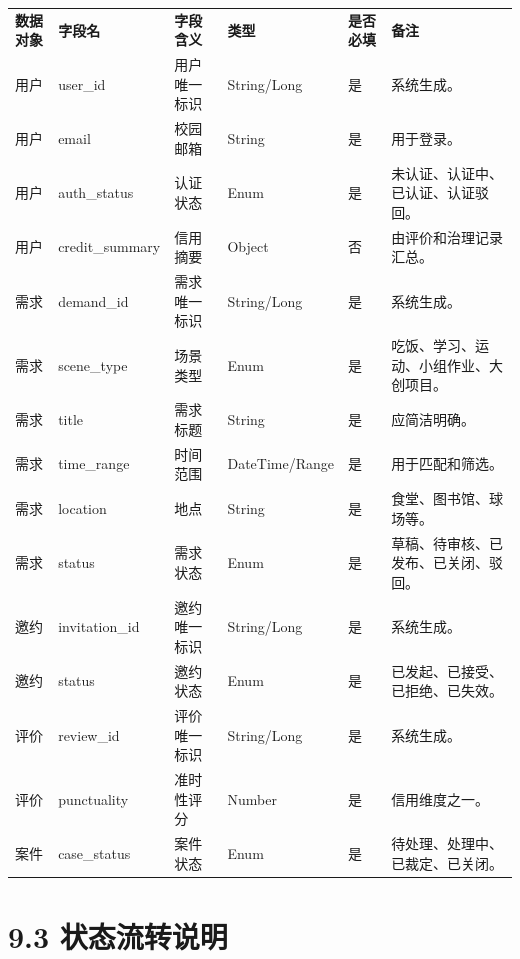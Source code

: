 {\def\LTcaptype{none} %
\begin{xltabular}{\textwidth}{@{}>{\centering\arraybackslash}X>{\centering\arraybackslash}X>{\centering\arraybackslash}X>{\centering\arraybackslash}X>{\centering\arraybackslash}X>{\centering\arraybackslash}X@{}}
\toprule\noalign{}
\endhead
\bottomrule\noalign{}
\endlastfoot
\textbf{数据对象} & \textbf{字段名} & \textbf{字段含义} & \textbf{类型}
& \textbf{是否必填} & \textbf{备注} \\
用户 & user\_id & 用户唯一标识 & String/Long & 是 & 系统生成。 \\
用户 & email & 校园邮箱 & String & 是 & 用于登录。 \\
用户 & auth\_status & 认证状态 & Enum & 是 &
未认证、认证中、已认证、认证驳回。 \\
用户 & credit\_summary & 信用摘要 & Object & 否 &
由评价和治理记录汇总。 \\
需求 & demand\_id & 需求唯一标识 & String/Long & 是 & 系统生成。 \\
需求 & scene\_type & 场景类型 & Enum & 是 &
吃饭、学习、运动、小组作业、大创项目。 \\
需求 & title & 需求标题 & String & 是 & 应简洁明确。 \\
需求 & time\_range & 时间范围 & DateTime/Range & 是 &
用于匹配和筛选。 \\
需求 & location & 地点 & String & 是 & 食堂、图书馆、球场等。 \\
需求 & status & 需求状态 & Enum & 是 &
草稿、待审核、已发布、已关闭、驳回。 \\
邀约 & invitation\_id & 邀约唯一标识 & String/Long & 是 & 系统生成。 \\
邀约 & status & 邀约状态 & Enum & 是 &
已发起、已接受、已拒绝、已失效。 \\
评价 & review\_id & 评价唯一标识 & String/Long & 是 & 系统生成。 \\
评价 & punctuality & 准时性评分 & Number & 是 & 信用维度之一。 \\
案件 & case\_status & 案件状态 & Enum & 是 &
待处理、处理中、已裁定、已关闭。 \\
\end{xltabular}
}

\section{9.3
状态流转说明}\label{ux72b6ux6001ux6d41ux8f6cux8bf4ux660e}

